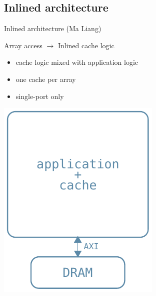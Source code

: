 \documentclass[handout,aspectratio=169]{beamer}
\begin{document}
\subsection{Inlined architecture}
\begin{frame}{Inlined architecture (Ma Liang)}
	\begin{minipage}{.7\textwidth}
		\begin{center}
			Array access $\rightarrow$ Inlined cache logic
		\end{center}

		\bigskip

		\begin{itemize}
			\item cache logic mixed with application logic
			\item one cache per array
			\item single-port only
		\end{itemize}
	\end{minipage}
	\begin{minipage}{.28\textwidth}
		\begin{center}
			\includegraphics[width=.8\textwidth]{liang_arch.pdf}
		\end{center}
	\end{minipage}
\end{frame}
\end{document}
